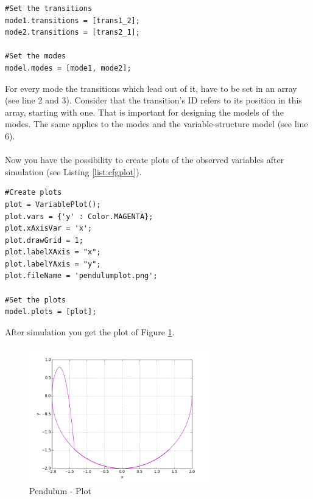 \lstset{language=python}
\begin{lstlisting}[frame=htrbl, caption={Pendulum Config.py - Set Transitions and Modes}, label={list:cfgstm}]
#Set the transitions
mode1.transitions = [trans1_2];
mode2.transitions = [trans2_1];

#Set the modes
model.modes = [mode1, mode2];
\end{lstlisting}

For every mode the transitions which lead out of it, have to be set in an array (see line 2 and 3). Consider that the transition's ID refers to its position in this array, starting with one. That is important for designing the models of the modes. The same applies to the modes and the variable-structure model (see line 6).\\
\\
Now you have the possibility to create plots of the observed variables after simulation (see Listing \ref{list:cfgplot}).

\lstset{language=python}
\begin{lstlisting}[frame=htrbl, caption={Pendulum Config.py - Set Plots}, label={list:cfgplot}]
#Create plots
plot = VariablePlot();
plot.vars = {'y' : Color.MAGENTA};
plot.xAxisVar = 'x';
plot.drawGrid = 1; 
plot.labelXAxis = "x";
plot.labelYAxis = "y";
plot.fileName = 'pendulumplot.png';

#Set the plots
model.plots = [plot];
\end{lstlisting}

After simulation you get the plot of Figure \ref{fig:pendulumplot}.\\

 \begin{figure}[htb]
 \centering
 \includegraphics[width=0.7\textwidth,angle=0]{images/GettingStarted/pendulumplot}
 \caption[Pendulum - Plot]{Pendulum - Plot}
 \label{fig:pendulumplot}
\end{figure}

